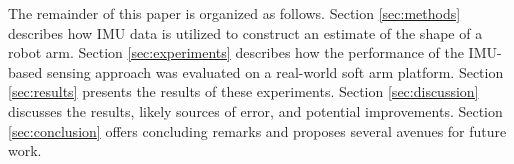 The remainder of this paper is organized as follows.
Section \ref{sec:methods} describes how IMU data is utilized to construct an estimate of the shape of a robot arm.
Section \ref{sec:experiments} describes how the performance of the IMU-based sensing approach was evaluated on a real-world soft arm platform.
Section \ref{sec:results} presents the results of these experiments.
Section \ref{sec:discussion} discusses the results, likely sources of error, and potential improvements.
Section \ref{sec:conclusion} offers concluding remarks and proposes several avenues for future work.
